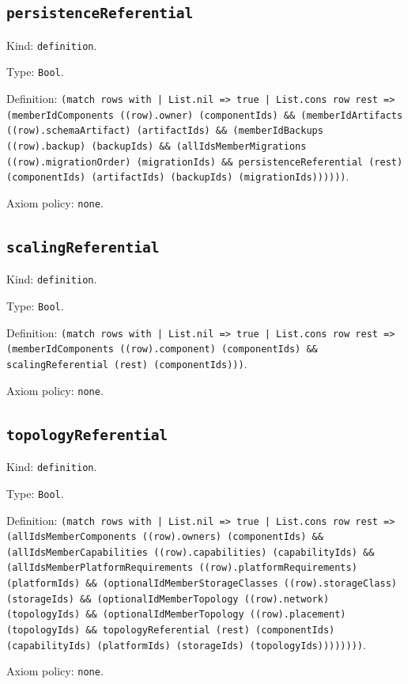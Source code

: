 \documentclass[11pt]{article}
\begin{document}
\subsection*{\texttt{persistenceReferential}}
\noindent Kind: \texttt{definition}.\par
\noindent Type: \texttt{Bool}.\par
\noindent Definition: \texttt{(match rows with | List.nil => true | List.cons row rest => (memberIdComponents ((row).owner) (componentIds) \&\& (memberIdArtifacts ((row).schemaArtifact) (artifactIds) \&\& (memberIdBackups ((row).backup) (backupIds) \&\& (allIdsMemberMigrations ((row).migrationOrder) (migrationIds) \&\& persistenceReferential (rest) (componentIds) (artifactIds) (backupIds) (migrationIds))))))}.\par
\noindent Axiom policy: \texttt{none}.\par
\subsection*{\texttt{scalingReferential}}
\noindent Kind: \texttt{definition}.\par
\noindent Type: \texttt{Bool}.\par
\noindent Definition: \texttt{(match rows with | List.nil => true | List.cons row rest => (memberIdComponents ((row).component) (componentIds) \&\& scalingReferential (rest) (componentIds)))}.\par
\noindent Axiom policy: \texttt{none}.\par
\subsection*{\texttt{topologyReferential}}
\noindent Kind: \texttt{definition}.\par
\noindent Type: \texttt{Bool}.\par
\noindent Definition: \texttt{(match rows with | List.nil => true | List.cons row rest => (allIdsMemberComponents ((row).owners) (componentIds) \&\& (allIdsMemberCapabilities ((row).capabilities) (capabilityIds) \&\& (allIdsMemberPlatformRequirements ((row).platformRequirements) (platformIds) \&\& (optionalIdMemberStorageClasses ((row).storageClass) (storageIds) \&\& (optionalIdMemberTopology ((row).network) (topologyIds) \&\& (optionalIdMemberTopology ((row).placement) (topologyIds) \&\& topologyReferential (rest) (componentIds) (capabilityIds) (platformIds) (storageIds) (topologyIds))))))))}.\par
\noindent Axiom policy: \texttt{none}.\par
\end{document}
